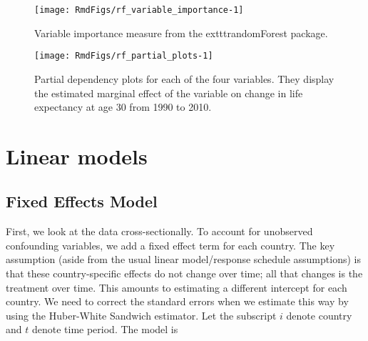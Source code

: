 \documentclass[11pt]{article}\usepackage[]{graphicx}\usepackage[]{color}
\makeatletter
\def\maxwidth{ %
  \ifdim\Gin@nat@width>\linewidth
    \linewidth
  \else
    \Gin@nat@width
  \fi
}
\newenvironment{knitrout}{}{} %
\makeatother
\begin{document}
\begin{knitrout}
\color{fgcolor}\begin{figure}

{\centering \texttt{[image: RmdFigs/rf\_variable\_importance-1]} 

}

\caption[Variable importance measure from the 	exttt{randomForest} package]{Variable importance measure from the 	exttt{randomForest} package.}\label{fig:rf_variable_importance}
\end{figure}


\end{knitrout}
\begin{knitrout}
\color{fgcolor}\begin{figure}

{\centering \texttt{[image: RmdFigs/rf\_partial\_plots-1]} 

}

\caption[Partial dependency plots for each of the four variables]{Partial dependency plots for each of the four variables. They display the estimated marginal effect of the variable on change in life expectancy at age 30 from 1990 to 2010.}\label{fig:rf_partial_plots}
\end{figure}


\end{knitrout}

\newpage

\section{Linear models}


\subsection{Fixed Effects Model}
First, we look at the data cross-sectionally.
To account for unobserved confounding variables, we add a fixed effect term for each country.
The key assumption (aside from the usual linear model/response schedule assumptions) is that these country-specific effects do not change over time; all that changes is the treatment over time.
This amounts to estimating a different intercept for each country.
We need to correct the standard errors when we estimate this way by using the Huber-White Sandwich estimator.
Let the subscript $i$ denote country and $t$ denote time period.
The model is
\end{document}
